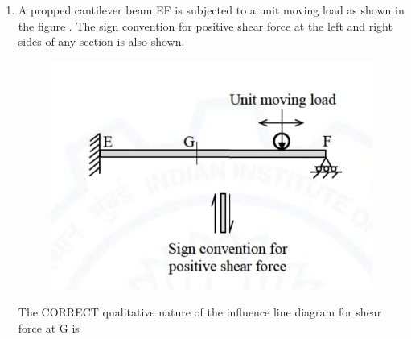 \documentclass[journal,12pt,onecolumn]{article}
\theoremstyle{remark}
\begin{document}
\begin{enumerate}
\item A propped cantilever beam EF is subjected to a unit moving load as shown in the figure . The sign convention for positive shear force at the left and right sides of any section is also shown.
\begin{figure}[H]
    \centering
    \includegraphics[width=0.7\columnwidth]{figs/1q4.jpg}
    \caption{}
    \label{fig:q4}
\end{figure}
The CORRECT qualitative nature of the influence line diagram for shear force at G is


\end{enumerate}
\end{document}
